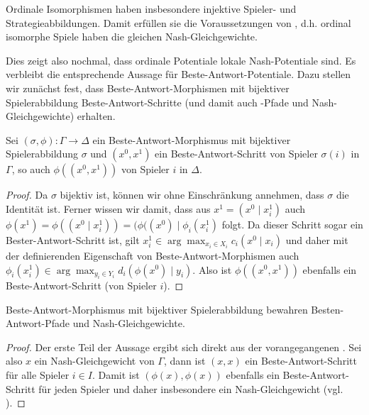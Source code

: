 \begin{bsp}
	Ordinale Isomorphismen haben insbesondere injektive Spieler- und Strategieabbildungen. Damit erfüllen sie die Voraussetzungen von , d.h. ordinal isomorphe Spiele haben die gleichen Nash-Gleichgewichte.
\end{bsp}

Dies zeigt also nochmal, dass ordinale Potentiale lokale Nash-Potentiale sind. Es verbleibt die entsprechende Aussage für Beste-Antwort-Potentiale. Dazu stellen wir zunächst fest, dass Beste-Antwort-Morphismen mit bijektiver Spielerabbildung Beste-Antwort-Schritte (und damit auch -Pfade und Nash-Gleichgewichte) erhalten.

\begin{prop}\label{prop:BAMorphErhBASchritte}
	Sei $(\sigma, \phi): \Gamma \to \Delta$ ein Beste-Antwort-Morphismus mit bijektiver Spielerabbildung $\sigma$ und $(x^0, x^1)$ ein Beste-Antwort-Schritt von Spieler $\sigma(i)$ in $\Gamma$, so auch $\phi((x^0, x^1))$ von Spieler $i$ in $\Delta$.
\end{prop}

\begin{proof}
	Da $\sigma$ bijektiv ist, können wir ohne Einschränkung annehmen, dass $\sigma$ die Identität ist. Ferner wissen wir damit, dass aus $x^1 = (x^0 \mid x^1_i)$ auch $\phi(x^1) = \phi((x^0 \mid x^1_i)) = (\phi((x^0) \mid \phi_i(x^1_i)$ folgt. Da dieser Schritt sogar ein Bester-Antwort-Schritt ist, gilt $x^1_i \in \arg\max_{x_i \in X_i} c_i(x^0 \mid x_i)$ und daher mit der definierenden Eigenschaft von Beste-Antwort-Morphismen auch $\phi_i(x^1_i) \in \arg\max_{y_i \in Y_i} d_i(\phi(x^0) \mid y_i)$. Also ist $\phi((x^0, x^1))$ ebenfalls ein Beste-Antwort-Schritt (von Spieler $i$).
\end{proof}

\begin{kor}
	Beste-Antwort-Morphismus mit bijektiver Spielerabbildung bewahren Besten-Antwort-Pfade und Nash-Gleichgewichte.
\end{kor}

\begin{proof}
	Der erste Teil der Aussage ergibt sich direkt aus der vorangegangenen . Sei also $x$ ein Nash-Gleichgewicht von $\Gamma$, dann ist $(x,x)$ ein Beste-Antwort-Schritt für alle Spieler $i \in I$. Damit ist $(\phi(x), \phi(x))$ ebenfalls ein Beste-Antwort-Schritt für jeden Spieler und daher insbesondere ein Nash-Gleichgewicht (vgl. ).
\end{proof}

